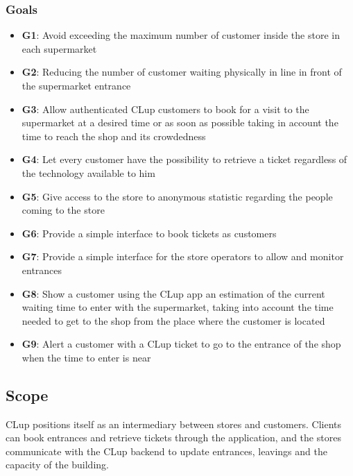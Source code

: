 \bigskip

\pagebreak

\subsubsection{Goals}
\begin{itemize}

      \item \textbf{G1}: Avoid exceeding the maximum number of customer inside the store in each supermarket

      \item \textbf{G2}: Reducing the number of customer waiting physically in line in front of the supermarket entrance

      \item \textbf{G3}: Allow authenticated CLup customers to book for a visit to the supermarket at a desired time or as soon as possible taking in account the time to reach the shop and its crowdedness

      \item \textbf{G4}: Let every customer have the possibility to retrieve a ticket regardless of the technology available to him

      \item \textbf{G5}: Give access to the store to anonymous statistic regarding the people coming to the store

      \item \textbf{G6}: Provide a simple interface to book tickets as customers

      \item \textbf{G7}: Provide a simple interface for the store operators to allow and monitor entrances

      \item \textbf{G8}: Show a customer using the CLup app an estimation of the current waiting time to enter with the supermarket, taking into account the time needed to get to the shop from the place where the customer is located

      \item \textbf{G9}: Alert a customer with a CLup ticket to go to the entrance of the shop when the time to enter is near
\end{itemize}

\subsection{Scope}
CLup positions itself as an intermediary between stores and customers. Clients can book entrances and retrieve tickets through the application, and the stores communicate with the CLup backend to update entrances, leavings and the capacity of the building.


